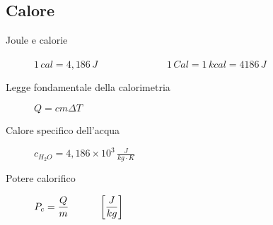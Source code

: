 \documentclass[a4paper,11pt,italian]{article}
\begin{document}
\subsection{Calore}

\begin{description}
  \item[Joule e calorie] $ 1 \, cal = 4,186 \, J $~~~~~~~~~~~~~~$ 1 \, Cal = 1 \, kcal = 4186 \, J $
  
  \item[Legge fondamentale della calorimetria] $ Q = cm \Delta T $
  
  \item[Calore specifico dell'acqua] $ c_{H_2O} = 4,186 \times 10^3 \, \frac{J}{kg \cdot K} $
  
  \item[Potere calorifico] 
  $ P_c = \dfrac{Q}{m} \hspace*{3em} \left[ \dfrac{J}{kg} \right] $
  
%
%


\end{description}
\end{document}
